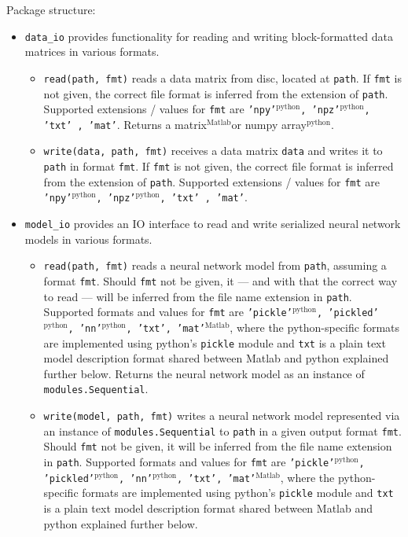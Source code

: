\documentclass[a4wide]{article}
\newcommand{\mat}{$^\text{Matlab}$}
\newcommand{\py}{$^\text{python}$}
\begin{document}
Package structure:
\begin{itemize}
\item \texttt{data\_io} provides functionality for reading and writing block-formatted data matrices in various formats.
	\begin{itemize}

		\item \texttt{read(path, fmt)} reads a data matrix from disc, located at \texttt{path}. If \texttt{fmt} is not given, the correct file format is inferred from the extension of \texttt{path}. Supported extensions / values for \texttt{fmt} are \texttt{'npy'\py , 'npz'\py , 'txt' , 'mat'}. Returns a matrix\mat or numpy array\py.

		\item \texttt{write(data, path, fmt)} receives a data matrix \texttt{data} and writes it to \texttt{path} in format \texttt{fmt}. If \texttt{fmt} is not given, the correct file format is inferred from the extension of \texttt{path}. Supported extensions / values for \texttt{fmt} are \texttt{'npy'\py , 'npz'\py , 'txt' , 'mat'}.

	\end{itemize}
\item \texttt{model\_io} provides an IO interface to read and write serialized neural network models in various formats.
	\begin{itemize}
		\item \texttt{read(path, fmt)} reads a neural network model from \texttt{path}, assuming a format \texttt{fmt}. Should \texttt{fmt} not be given, it --- and with that the correct way to read --- will be inferred from the file name extension in \texttt{path}. Supported formats and values for \texttt{fmt} are \texttt{'pickle'\py , 'pickled'\py , 'nn'\py, 'txt', 'mat'\mat}, where the python-specific formats are implemented using python's \texttt{pickle} module and \texttt{txt} is a plain text model description format shared between Matlab and python explained further below. Returns the neural network model as an instance of \texttt{modules.Sequential}.


		\item \texttt{write(model, path, fmt)} writes a neural network model represented via an instance of \texttt{modules.Sequential} to \texttt{path} in a given output format \texttt{fmt}. Should \texttt{fmt} not be given, it will be inferred from the file name extension in \texttt{path}. Supported formats and values for \texttt{fmt} are \texttt{'pickle'\py , 'pickled'\py , 'nn'\py, 'txt', 'mat'\mat}, where the python-specific formats are implemented using python's \texttt{pickle} module and \texttt{txt} is a plain text model description format shared between Matlab and python explained further below.



\end{itemize}
\end{itemize}
\end{document}
